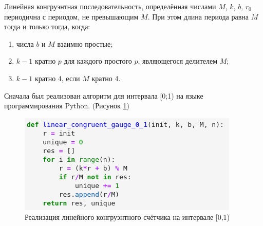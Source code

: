 \documentclass[14pt,fleqn]{extarticle}
\begin{document}
    \newpage
    Линейная конгруэнтная последовательность, определённая числами $M$, $k$, $b$, $r_0$ периодична с периодом, не превышающим $M$. При этом длина периода равна $M$ тогда и только тогда, когда:
    \begin{enumerate}[topsep=0pt,itemsep=-1ex,partopsep=1ex,parsep=1ex]
        \item числа $b$ и $M$ взаимно простые;
        \item $k-1$ кратно $p$ для каждого простого $p$, являющегося делителем $M$;
        \item $k-1$ кратно 4, если $M$ кратно 4.
    \end{enumerate}
    Сначала был реализован алгоритм для интервала [0;1) на языке программирования Python. (Рисунок \ref{fig:linear_congruent_gauge_0_1_code})
    \begin{figure}[h]
        \centering \includegraphics[scale=0.8]{linear_congruent_gauge_0_1_code}
        \caption{Реализация линейного конгруэнтного счётчика на интервале [0,1)}
        \label{fig:linear_congruent_gauge_0_1_code}
    \end{figure}
\end{document}
